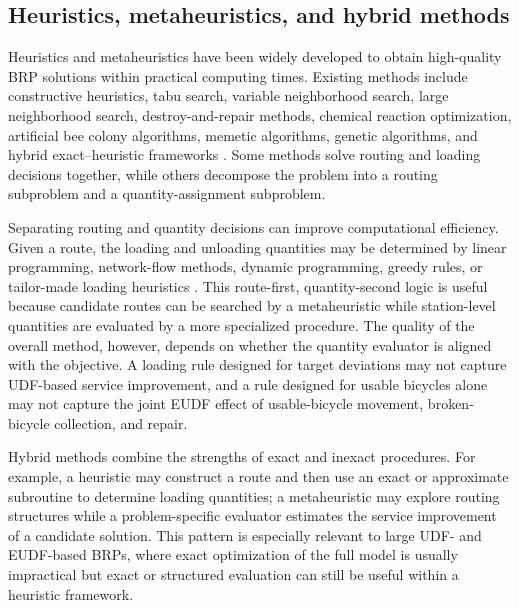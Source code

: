 \subsection{Heuristics, metaheuristics, and hybrid methods}

Heuristics and metaheuristics have been widely developed to obtain high-quality BRP solutions within practical computing times. Existing methods include constructive heuristics, tabu search, variable neighborhood search, large neighborhood search, destroy-and-repair methods, chemical reaction optimization, artificial bee colony algorithms, memetic algorithms, genetic algorithms, and hybrid exact--heuristic frameworks \citep{hoSolvingStaticRepositioning2014,rainer-harbachPILOTGRASPVNS2015,szetoChemicalReactionOptimization2016,hoHybridLargeNeighborhood2017,liuStaticFreefloatingBike2018,luEffectiveMemeticAlgorithm2020,wangEnhancedArtificialBee2021}. Some methods solve routing and loading decisions together, while others decompose the problem into a routing subproblem and a quantity-assignment subproblem.

Separating routing and quantity decisions can improve computational efficiency. Given a route, the loading and unloading quantities may be determined by linear programming, network-flow methods, dynamic programming, greedy rules, or tailor-made loading heuristics \citep{forma3stepMathHeuristic2015,rainer-harbachPILOTGRASPVNS2015,liMultipleTypeBike2016,zhangTimespaceNetworkFlow2017}. This route-first, quantity-second logic is useful because candidate routes can be searched by a metaheuristic while station-level quantities are evaluated by a more specialized procedure. The quality of the overall method, however, depends on whether the quantity evaluator is aligned with the objective. A loading rule designed for target deviations may not capture UDF-based service improvement, and a rule designed for usable bicycles alone may not capture the joint EUDF effect of usable-bicycle movement, broken-bicycle collection, and repair.

Hybrid methods combine the strengths of exact and inexact procedures. For example, a heuristic may construct a route and then use an exact or approximate subroutine to determine loading quantities; a metaheuristic may explore routing structures while a problem-specific evaluator estimates the service improvement of a candidate solution. This pattern is especially relevant to large UDF- and EUDF-based BRPs, where exact optimization of the full model is usually impractical but exact or structured evaluation can still be useful within a heuristic framework.

